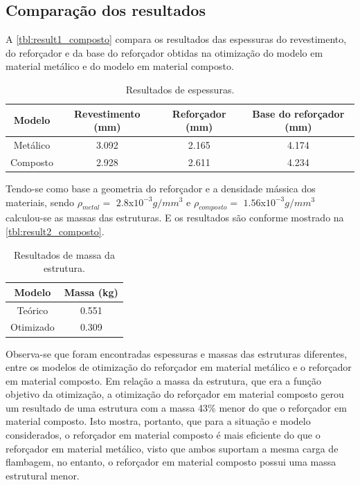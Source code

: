 \subsection{Comparação dos resultados}

A \autoref{tbl:result1_composto} compara os resultados das espessuras do revestimento, do reforçador e da base do reforçador obtidas na otimização do modelo em material metálico e do modelo em material composto.
\begin{table}[h]
\centering
\begin{tabular}{cccc}
\toprule
Modelo & Revestimento (mm) & Reforçador (mm) & Base do reforçador (mm) \\\midrule
Metálico & 3.092 & 2.165 & 4.174 \\
Composto & 2.928 & 2.611 & 4.234\\
\bottomrule
\end{tabular}
\caption{Resultados de espessuras.}
\label{tbl:result1_composto}
\end{table}

Tendo-se como base a geometria do reforçador e a densidade mássica dos materiais, sendo $\rho_{metal} =$ $2.8$x$10^{-3} g/mm^3$ e $\rho_{composto} =$ $1.56$x$10^{-3} g/mm^3$ calculou-se as massas das estruturas. E os resultados são conforme mostrado na \autoref{tbl:result2_composto}.

\begin{table}[h]
\centering
\begin{tabular}{cc}
\toprule
Modelo & Massa (kg) \\ \midrule
Teórico & 0.551\\
Otimizado & 0.309\\
\bottomrule
\end{tabular}
\caption{Resultados de massa da estrutura.}
\label{tbl:result2_composto}
\end{table}

Observa-se que foram encontradas espessuras e massas das estruturas diferentes, entre os modelos de otimização do reforçador em material metálico e o reforçador em material composto.
Em relação a massa da estrutura, que era a função objetivo da otimização, a otimização do reforçador em material composto gerou um resultado de uma estrutura com a massa 43\% menor do que o reforçador em material composto. Isto mostra, portanto, que para a situação e modelo considerados, o reforçador em material composto é mais eficiente do que o reforçador em material metálico, visto que ambos suportam a mesma carga de flambagem, no entanto, o reforçador em material composto possui uma massa estrutural menor.
